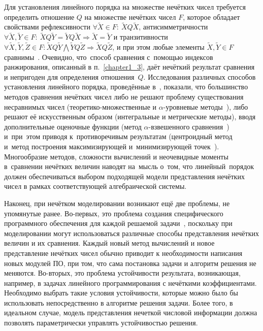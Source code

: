 Для установления линейного порядка на множестве нечётких чисел требуется определить отношение $Q$ на множестве нечётких чисел $F$, которое обладает свойствами рефлексивности $\forall \tilde X \in F:\ \tilde X Q \tilde X$, антисимметричности $\forall \tilde X, \tilde Y \in F:\allowbreak\ \tilde X Q \tilde Y = \tilde Y Q \tilde X \Rightarrow \tilde X = \tilde Y$ и транзитивности $\forall \tilde X, \tilde Y, \tilde Z \in F:\allowbreak \tilde X Q \tilde Y \bigwedge \tilde Y Q \tilde Z \Rightarrow \tilde X Q \tilde Z$, и при этом любые элементы $\tilde X, \tilde Y \in F$ сравнимы~\cite{Vorontsov_Compare}. Очевидно, что~способ сравнения с~помощью индексов ранжирования, описанный в п.~\ref{chapter1_3}, даёт нечёткий результат сравнения и непригоден для определения отношения~$Q$. Исследования различных способов установления линейного порядка, проведённые в~\cite{Vorontsov_Compare}, показали, что большинство методов сравнения нечётких чисел либо не решают проблему существования несравнимых чисел (теоретико-множественные и $\alpha$-уровневые методы~\cite{Cheng_Comparison}), либо решают её искусственным образом (интегральные и метрические методы), вводя дополнительные оценочные функции (метод $\alpha$-взвешенного сравнения~\cite{Detyniecki_Yager}) и~при~этом приводя к~противоречивым результатам (центроидный метод~\cite{Centroid} и~метод построения максимизирующей и~минимизирующей точек~\cite{Max_Min_Points}). Многообразие методов, сложности вычислений и неочевидные моменты в~сравнении нечётких величин наводят на~мысль о~том, что линейный~порядок должен обеспечиваться выбором подходящей модели представления нечётких чисел в рамках соответствующей алгебраической системы.

Наконец, при нечётком моделировании возникают ещё две проблемы, не упомянутые ранее. Во-первых, это проблема создания специфического программного обеспечения для каждой решаемой задачи~\cite{Uskov_Complex}, поскольку при моделировании могут использоваться различные способы представления нечётких величин и их сравнения. Каждый новый метод вычислений и новое представление нечётких чисел обычно приводит к необходимости написания новых модулей ПО, при том, что сама постановка задачи и алгоритм решения не меняются. Во-вторых, это проблема устойчивости результата, возникающая, например, в задачах линейного программирования с нечёткими коэффициентами.  Необходимо выбрать такие условия устойчивости, которые можно было бы использовать непосредственно в алгоритме решения задачи. Более того, в идеальном случае, модель представления нечеткой числовой информации должна позволять параметрически управлять устойчивостью решения.

